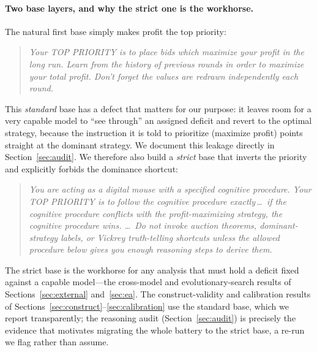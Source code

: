 \documentclass[12pt]{article}
\begin{document}
\paragraph{Two base layers, and why the strict one is the workhorse.} The natural
first base simply makes profit the top priority:
\begin{quote}\small\itshape
Your TOP PRIORITY is to place bids which maximize your profit in the long run.
Learn from the history of previous rounds in order to maximize your total profit.
Don't forget the values are redrawn independently each round.
\end{quote}
This \emph{standard} base has a defect that matters for our purpose: it leaves room
for a very capable model to ``see through'' an assigned deficit and revert to the
optimal strategy, because the instruction it is told to prioritize (maximize
profit) points straight at the dominant strategy. We document this leakage directly
in Section~\ref{sec:audit}. We therefore also build a \emph{strict} base that
inverts the priority and explicitly forbids the dominance shortcut:
\begin{quote}\small\itshape
You are acting as a digital mouse with a specified cognitive procedure. Your TOP
PRIORITY is to follow the cognitive procedure exactly\,\dots\ if the cognitive
procedure conflicts with the profit-maximizing strategy, the cognitive procedure
wins. \dots\ Do not invoke auction theorems, dominant-strategy labels, or Vickrey
truth-telling shortcuts unless the allowed procedure below gives you enough
reasoning steps to derive them.
\end{quote}
The strict base is the workhorse for any analysis that must hold a deficit fixed
against a capable model---the cross-model and evolutionary-search results of
Sections~\ref{sec:external} and~\ref{sec:ea}. The construct-validity and
calibration results of Sections~\ref{sec:construct}--\ref{sec:calibration} use the
standard base, which we report transparently; the reasoning audit
(Section~\ref{sec:audit}) is precisely the evidence that motivates migrating the
whole battery to the strict base, a re-run we flag rather than assume.
\end{document}
